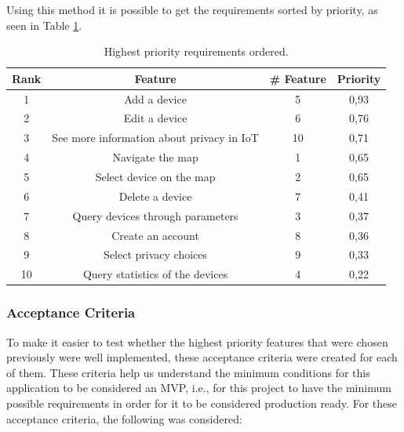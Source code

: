 Using this method it is possible to get the requirements sorted by priority,
as seen in Table \ref{table:sorted requirements}.

\begin{table}[H]
    \centering
    \begin{adjustbox}{width=0.8\textwidth,center=\textwidth}
        \begin{tabular}{|c|c|c|c|}
            \hline
            \rowcolor{gray!5}
            \textbf{Rank} & \textbf{Feature} & \textbf{\# Feature} & \textbf{Priority} \\
            \hline
            1 & Add a device & 5 & 0,93 \\
            \hline
            2 & Edit a device & 6 & 0,76 \\
            \hline
            3 & See more information about privacy in IoT & 10 & 0,71 \\
            \hline
            4 & Navigate the map & 1 & 0,65 \\
            \hline
            5 & Select device on the map & 2 & 0,65 \\
            \hline
            6 & Delete a device & 7 & 0,41 \\
            \hline
            7 & Query devices through parameters & 3 & 0,37 \\
            \hline
            8 & Create an account & 8 & 0,36 \\
            \hline
            9 & Select privacy choices & 9 & 0,33 \\
            \hline
            10 & Query statistics of the devices & 4 & 0,22 \\
            \hline
        \end{tabular}
    \end{adjustbox}
    \vspace{1em}
    \caption{Highest priority requirements ordered.}
    \label{table:sorted requirements}
\end{table}

\subsubsection{Acceptance Criteria}

To make it easier to test whether the highest priority features that were chosen
previously were well implemented, these acceptance criteria were created for each
of them. These criteria help us understand the minimum conditions for this
application to be considered an MVP, i.e., for this project to have the minimum
possible requirements in order for it to be considered production ready.
\newline
For these acceptance criteria, the following was considered:

